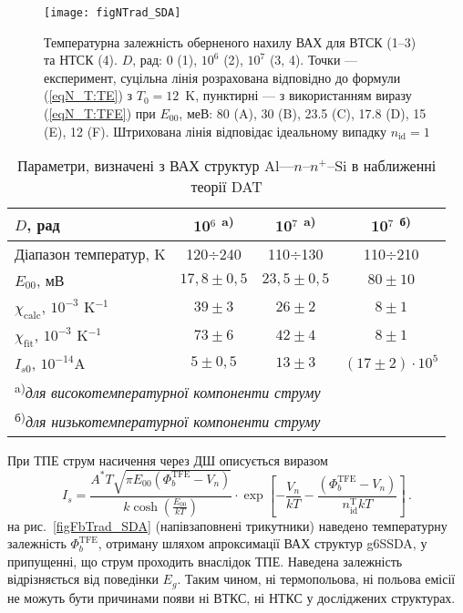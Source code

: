 \begin{figure}
\center
\texttt{[image: figNTrad\_SDA]}
\caption{\label{figNTrad_SDA}
Температурна залежність оберненого нахилу ВАХ для ВТСК (1--3)
та НТСК (4).
$D$, рад: $0$ (1), $10^6$ (2), $10^7$ (3, 4).
Точки --- експеримент,
суцільна лінія розрахована відповідно до формули (\ref{eqN_T:TE}) з $T_0=12$~K,
пунктирні --- з використанням виразу (\ref{eqN_T:TFE}) при
$E_{00}$, меВ: 80 (A), 30 (B), 23.5 (C), 17.8 (D), 15 (E), 12 (F).
Штрихована лінія відповідає ідеальному випадку $n_{\mathrm{id}}=1$
}%
\end{figure}


\begin{table}
\caption{Параметри, визначені з ВАХ структур Al---$n$--$n^+$--Si в наближенні теорії DAT}
\label{tabSDAParRad:DAT}
\centering
\begin{tabular}{|l|c|c|c|}
\hline
$D$, рад &10$^6$ \textsuperscript{ a)}&10$^7$ \textsuperscript{ a)}&10$^7$ \textsuperscript{ б)}\\ \hline
Діапазон температур, K&120$\div$240&110$\div$130&110$\div$210\\
$E_{00}$, мВ&$17,8\pm0,5$&$23,5\pm0,5$&$80\pm10$\\
$\chi_\mathrm{calc}$, $10^{-3}$ K$^{-1}$&$39\pm3$&$26\pm2$&$8\pm1$\\
$\chi_\mathrm{fit}$, $10^{-3}$ K$^{-1}$&$73\pm6$&$42\pm4$&$8\pm1$\\
$I_{s0}$, $10^{-14}$A&$5\pm0,5$&$13\pm3$&$(17\pm2)\cdot10^{5}$\\
\hline
\multicolumn{4}{l}{\textsuperscript{ a)}\emph{для високотемпературної компоненти струму}}\\
\multicolumn{4}{l}{\textsuperscript{ б)}\emph{для низькотемпературної компоненти струму}}\\
\end{tabular}
\end{table}

При ТПЕ струм насичення через ДШ описується виразом \cite{Rhoderick1988, Roul}
\begin{equation}\label{eqIs:TFE}
  I_s=\frac{A^*T\sqrt{\pi{E_{00}}(\Phi_b^\mathrm{TFE}-V_n)}}{k\cosh\left(\frac{E_{00}}{kT}\right)}\cdot
  \exp\left[-\frac{V_n}{kT}-\frac{(\Phi_b^\mathrm{TFE}-V_n)}{n_{\mathrm{id}}^\mathrm{T}kT}\right]\,.
\end{equation}
на рис.~\ref{figFbTrad_SDA} (напівзаповнені трикутники) наведено температурну залежність $\Phi_b^\mathrm{TFE}$, отриману шляхом апроксимації ВАХ структур g6SSDA,
у припущенні, що струм проходить внаслідок ТПЕ.
Наведена залежність відрізняється від поведінки $E_g$.
Таким чином, ні термопольова, ні польова емісії не можуть бути причинами появи ні ВТКС, ні НТКС у досліджених структурах.

